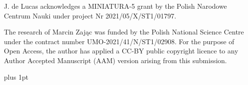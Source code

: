 \documentclass[11pt]{article}
\theoremstyle{plain}
\theoremstyle{definition}
\begin{document}
J. de Lucas acknowledges a MINIATURA-5 grant by the Polish Narodowe Centrum Nauki under project Nr 2021/05/X/ST1/01797. %


The research of Marcin Zaj\k ac was funded by the Polish National Science Centre under the contract number UMO-2021/41/N/ST1/02908. For the purpose of Open Access, the author has applied a CC-BY public copyright licence to any
Author Accepted Manuscript (AAM) version arising from this submission.


	

\itemsep 0pt plus 1pt

\end{document}
